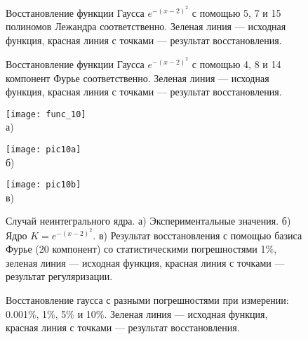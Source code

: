 \begin{figure}[htbp! ]
	\label{pic:6}
	\caption{Восстановление функции Гаусса $e^{-(x-2)^2}$ с помощью 5, 7 и 15 полиномов Лежандра соответственно. Зеленая линия --- исходная функция, красная линия с точками --- результат восстановления.}
\end{figure}

\begin{figure}[htbp! ]
	\label{pic:7}
	\caption{Восстановление функции Гаусса $e^{-(x-2)^2}$ с помощью 4, 8 и 14 компонент Фурье соответственно. Зеленая линия --- исходная функция, красная линия с точками --- результат восстановления.}
\end{figure}

\begin{figure}[htbp! ]
\begin{center}
\begin{minipage}[h]{0.3\linewidth}
	\texttt{[image: func\_10]} \\а)
\end{minipage}
	\hfill
\begin{minipage}[h]{0.3\linewidth}
\texttt{[image: pic10a]} \\б)
\end{minipage}
\hfill
\begin{minipage}[h]{0.3\linewidth}
	\texttt{[image: pic10b]} \\в)
\end{minipage}
	\caption{Случай неинтегрального ядра. а) Экспериментальные значения. б) Ядро $K=e^{-(x-2)^2}$. в) Результат восстановления с помощью базиса Фурье (20 компонент) со статистическими погрешностями 1\%, зеленая линия --- исходная функция, красная линия с точками --- результат регуляризации.}
\label{pic:gausskernel}
\end{center}
\end{figure}

\begin{figure}[htbp! ]
	\caption{Восстановление гаусса с разными погрешностями при измерении: 0.001\%, 1\%, 5\% и 10\%. Зеленая линия --- исходная функция, красная линия с точками --- результат восстановления.}
	\label{pic:noize}
\end{figure}

